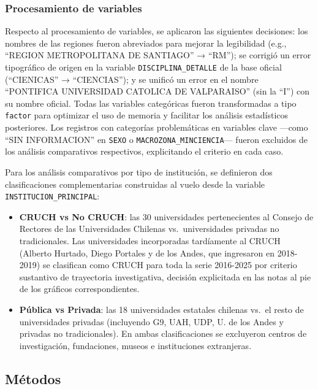 \documentclass[
  12pt,
  letterpaper,
]{article}
\begin{document}
\subsubsection{Procesamiento de
variables}\label{procesamiento-de-variables}

Respecto al procesamiento de variables, se aplicaron las siguientes
decisiones: los nombres de las regiones fueron abreviados para mejorar
la legibilidad (e.g., ``REGION METROPOLITANA DE SANTIAGO'' → ``RM''); se
corrigió un error tipográfico de origen en la variable
\texttt{DISCIPLINA\_DETALLE} de la base oficial (``CIENICAS'' →
``CIENCIAS''); y se unificó un error en el nombre ``PONTIFICA
UNIVERSIDAD CATOLICA DE VALPARAISO'' (sin la ``I'') con su nombre
oficial. Todas las variables categóricas fueron transformadas a tipo
\texttt{factor} para optimizar el uso de memoria y facilitar los
análisis estadísticos posteriores. Los registros con categorías
problemáticas en variables clave ---como ``SIN INFORMACION'' en
\texttt{SEXO} o \texttt{MACROZONA\_MINCIENCIA}--- fueron excluidos de
los análisis comparativos respectivos, explicitando el criterio en cada
caso.

Para los análisis comparativos por tipo de institución, se definieron
dos clasificaciones complementarias construidas al vuelo desde la
variable \texttt{INSTITUCION\_PRINCIPAL}:

\begin{itemize}
\item
  \textbf{CRUCH vs No CRUCH}: las 30 universidades pertenecientes al
  Consejo de Rectores de las Universidades Chilenas vs.~universidades
  privadas no tradicionales. Las universidades incorporadas tardíamente
  al CRUCH (Alberto Hurtado, Diego Portales y de los Andes, que
  ingresaron en 2018-2019) se clasifican como CRUCH para toda la serie
  2016-2025 por criterio sustantivo de trayectoria investigativa,
  decisión explicitada en las notas al pie de los gráficos
  correspondientes.
\item
  \textbf{Pública vs Privada}: las 18 universidades estatales chilenas
  vs.~el resto de universidades privadas (incluyendo G9, UAH, UDP, U. de
  los Andes y privadas no tradicionales). En ambas clasificaciones se
  excluyeron centros de investigación, fundaciones, museos e
  instituciones extranjeras.
\end{itemize}

\subsection{Métodos}\label{muxe9todos}
\end{document}

